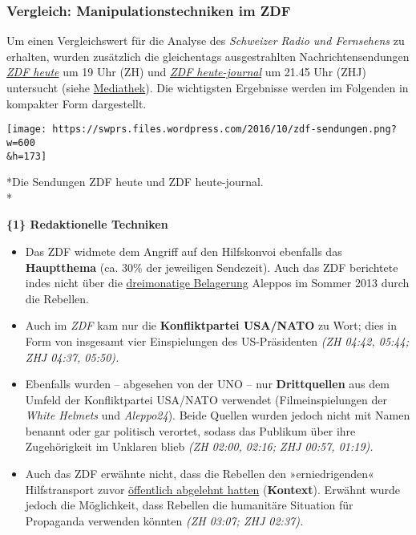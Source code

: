 \hypertarget{vergleich-manipulationstechniken-im-zdf}{%
\subsubsection{Vergleich: Manipulationstechniken im
ZDF}\label{vergleich-manipulationstechniken-im-zdf}}

Um einen Vergleichswert für die Analyse des \emph{Schweizer Radio und
Fernsehens} zu erhalten, wurden zusätzlich die gleichentags
ausgestrahlten Nachrichten­sendungen
\emph{\href{https://swprs.org/zdf-heute-journal/}{ZDF heute}} um 19 Uhr
(ZH) und \emph{\href{https://swprs.org/zdf-heute-journal/}{ZDF
heute-journal}} um 21.45 Uhr (ZHJ) untersucht (siehe
\href{https://swprs.org/zdf-heute-journal/}{Mediathek}). Die wichtigsten
Ergebnisse werden im Folgenden in kompakter Form dargestellt.

\texttt{[image: https://swprs.files.wordpress.com/2016/10/zdf-sendungen.png?w=600\\\&h=173]}

*Die Sendungen ZDF heute und ZDF heute-journal.\\
*

\textbf{\{1\} Redaktionelle Techniken}

\begin{itemize}
\tightlist
\item
  Das ZDF widmete dem Angriff auf den Hilfskonvoi ebenfalls das
  \textbf{Hauptthema} (ca. 30\% der jeweiligen Sendezeit). Auch das ZDF
  berichtete indes nicht über die
  \href{http://www.thealeppoproject.com/aleppo-conflict-timeline-2013/}{dreimonatige
  Belagerung} Aleppos im Sommer 2013 durch die Rebellen.
\item
  Auch im \emph{ZDF} kam nur die \textbf{Konfliktpartei USA/NATO} zu
  Wort; dies in Form von insgesamt vier Einspielungen des US-Präsidenten
  \emph{(ZH 04:42, 05:44; ZHJ 04:37, 05:50).}
\item
  Ebenfalls wurden -- abgesehen von der UNO -- nur \textbf{Drittquellen}
  aus dem Umfeld der Konfliktpartei USA/NATO verwendet
  (Filmeinspielungen der \emph{White Helmets} und \emph{Aleppo24}).
  Beide Quellen wurden jedoch nicht mit Namen benannt oder gar politisch
  verortet, sodass das Publikum über ihre Zugehörigkeit im Unklaren
  blieb \emph{(ZH 02:00, 02:16; ZHJ 00:57, 01:19).}
\item
  Auch das ZDF erwähnte nicht, dass die Rebellen den »erniedrigenden«
  Hilfstransport zuvor
  \href{https://web.archive.org/web/20170202013724/http://ogn.news/306/}{öffentlich
  abgelehnt hatten} (\textbf{Kontext}). Erwähnt wurde jedoch die
  Möglichkeit, dass Rebellen die humanitäre Situation für Propaganda
  verwenden könnten \emph{(ZH 03:07; ZHJ 02:37).}
\end{itemize}

